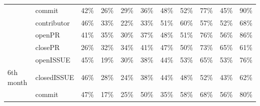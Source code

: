 \documentclass[smallextended]{svjour3}
\begin{document}
\begin{table}[!t]
{\begin{tabular}{llccccccccc}
                                     & commit                               & \cellcolor[HTML]{D2D2D2}42\% & \cellcolor[HTML]{E7E7E7}26\% & \cellcolor[HTML]{E4E4E4}29\% & \cellcolor[HTML]{DADADA}36\% & \cellcolor[HTML]{C8C8C8}48\% & \cellcolor[HTML]{BFBFBF}52\% & \cellcolor[HTML]{888888}77\% & \cellcolor[HTML]{CECECE}45\% & \cellcolor[HTML]{6A6A6A}90\% \\
                                     & contributor                          & \cellcolor[HTML]{CDCDCD}46\% & \cellcolor[HTML]{DEDEDE}33\% & \cellcolor[HTML]{EDEDED}22\% & \cellcolor[HTML]{DEDEDE}33\% & \cellcolor[HTML]{C3C3C3}51\% & \cellcolor[HTML]{AEAEAE}60\% & \cellcolor[HTML]{B4B4B4}57\% & \cellcolor[HTML]{BEBEBE}52\% & \cellcolor[HTML]{9C9C9C}68\% \\
                                     & openPR                               & \cellcolor[HTML]{D3D3D3}41\% & \cellcolor[HTML]{DBDBDB}35\% & \cellcolor[HTML]{E2E2E2}30\% & \cellcolor[HTML]{D8D8D8}37\% & \cellcolor[HTML]{C7C7C7}48\% & \cellcolor[HTML]{C2C2C2}51\% & \cellcolor[HTML]{8A8A8A}76\% & \cellcolor[HTML]{B7B7B7}56\% & \cellcolor[HTML]{747474}86\% \\
                                     & closePR                              & \cellcolor[HTML]{E7E7E7}26\% & \cellcolor[HTML]{DFDFDF}32\% & \cellcolor[HTML]{DDDDDD}34\% & \cellcolor[HTML]{D4D4D4}41\% & \cellcolor[HTML]{CBCBCB}47\% & \cellcolor[HTML]{C4C4C4}50\% & \cellcolor[HTML]{919191}73\% & \cellcolor[HTML]{A3A3A3}65\% & \cellcolor[HTML]{ABABAB}61\% \\
                                     & openISSUE                            & \cellcolor[HTML]{CECECE}45\% & \cellcolor[HTML]{F1F1F1}19\% & \cellcolor[HTML]{E2E2E2}30\% & \cellcolor[HTML]{D7D7D7}38\% & \cellcolor[HTML]{CFCFCF}44\% & \cellcolor[HTML]{BDBDBD}53\% & \cellcolor[HTML]{A2A2A2}65\% & \cellcolor[HTML]{BDBDBD}53\% & \cellcolor[HTML]{8A8A8A}76\% \\
\multirow{-6}{*}{6th month}          & closedISSUE                          & \cellcolor[HTML]{CCCCCC}46\% & \cellcolor[HTML]{E4E4E4}28\% & \cellcolor[HTML]{EAEAEA}24\% & \cellcolor[HTML]{D7D7D7}38\% & \cellcolor[HTML]{CFCFCF}44\% & \cellcolor[HTML]{C8C8C8}48\% & \cellcolor[HTML]{BFBFBF}52\% & \cellcolor[HTML]{D1D1D1}43\% & \cellcolor[HTML]{A8A8A8}62\% \\ \hline
                                     & commit                               & \cellcolor[HTML]{CACACA}47\% & \cellcolor[HTML]{F3F3F3}17\% & \cellcolor[HTML]{E9E9E9}25\% & \cellcolor[HTML]{C4C4C4}50\% & \cellcolor[HTML]{DCDCDC}35\% & \cellcolor[HTML]{B1B1B1}58\% & \cellcolor[HTML]{9C9C9C}68\% & \cellcolor[HTML]{B6B6B6}56\% & \cellcolor[HTML]{818181}80\% \\

\end{tabular}}
\end{table}
\end{document}
